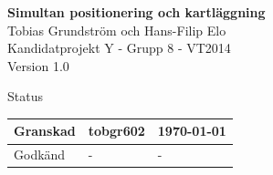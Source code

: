 \documentclass[a4paper,12pt,fleqn]{article}
\begin{document}
	\pagestyle{fancy}
	\vspace*{\fill}
		\begingroup
			\begin{center}
				\huge{\textbf{Simultan positionering och kartläggning}}
				\\
				\vspace{10pt}
				\normalsize
				Tobias Grundström och Hans-Filip Elo
				\\
				Kandidatprojekt Y - Grupp 8 - VT2014
				\\
				Version 1.0
				\end{center}
		\endgroup
	\vspace*{\fill}

	\begin{center} %
		Status
		\\
		\vspace{3pt} %
	    \begin{tabular}{| p{3cm} | p{3cm} | p{3cm} |} %
	    \hline %
	    Granskad & tobgr602 & \today \\ \hline %
		Godkänd & - & - \\ \hline %

	    \end{tabular}
	\end{center}
	\vspace{2cm}
	\newpage
\end{document}
